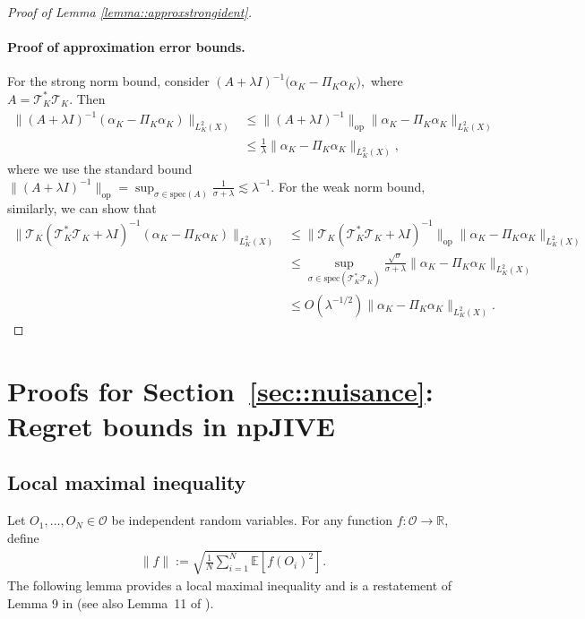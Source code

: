 \documentclass[11pt]{article}
\theoremstyle{plain}
\theoremstyle{definition}
\theoremstyle{remark}
\theoremstyle{definition}
\begin{document}
\begin{proof}[Proof of Lemma \ref{lemma::approxstrongident}]
\paragraph{Proof of approximation error bounds.} For the strong norm bound, consider \((A + \lambda I)^{-1}\bigl(\alpha_K - \Pi_{K} \alpha_K\bigr),\)
where \(A = \mathcal{T}_{K}^* \mathcal{T}_{K}\). Then
\begin{align*}
    \|(A + \lambda I)^{-1} (\alpha_K - \Pi_{K} \alpha_K)\|_{L^2_K(X)} 
    & \leq \|(A + \lambda I)^{-1}\|_{\text{op}} \|\alpha_K - \Pi_{K} \alpha_K\|_{L^2_K(X)} \\
    & \leq \frac{1}{\lambda} \|\alpha_K - \Pi_{K} \alpha_K\|_{L^2_K(X)},
\end{align*}
where we use the standard bound \(\|(A + \lambda I)^{-1}\|_{\text{op}} = \sup_{\sigma \in \text{spec}(A)} \frac{1}{\sigma + \lambda} \lesssim \lambda^{-1}.\) For the weak norm bound, similarly, we can show that
\begin{align*}
    \| \mathcal{T}_{K}(\mathcal{T}_{K}^* \mathcal{T}_{K} + \lambda I)^{-1} (\alpha_K - \Pi_{K} \alpha_K) \|_{L^2_K(X)} 
    & \leq \| \mathcal{T}_{K}(\mathcal{T}_{K}^* \mathcal{T}_{K} + \lambda I)^{-1} \|_{\text{op}} \|\alpha_K - \Pi_{K} \alpha_K\|_{L^2_K(X)} \\
    & \leq \sup_{\sigma \in \text{spec}(\mathcal{T}_{K}^* \mathcal{T}_{K})} \frac{\sqrt{\sigma}}{\sigma + \lambda} \|\alpha_K - \Pi_{K} \alpha_K\|_{L^2_K(X)} \\
    & \leq O\left(\lambda^{-1/2} \right) \|\alpha_K - \Pi_{K} \alpha_K\|_{L^2_K(X)}.
\end{align*}

\end{proof}


 

 \section{Proofs for Section~\ref{sec::nuisance}: Regret bounds in npJIVE}
 

  

\subsection{Local maximal inequality}

  Let $O_1,\ldots,O_N \in \mathcal{O}$ be independent random variables. For any function $f:\mathcal{O} \to \mathbb{R}$, define
\begin{align}
    \|f\| := \sqrt{\frac{1}{N} \sum_{i=1}^N \mathbb{E}[f(O_i)^2]}.
\end{align}
 The following lemma provides a local maximal inequality and is a restatement of Lemma 9 in \cite{bibaut2024nonparametric} (see also Lemma~11 of \cite{foster2023orthogonal}).
\end{document}
